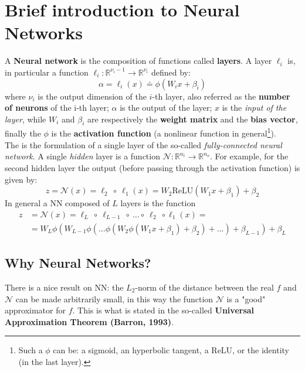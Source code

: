 \section{Brief introduction to Neural Networks}
A \textbf{Neural network} is the composition of functions called \textbf{layers}. A layer $\ell_i$ is, in particular a function $\ell_i: \mathbb{R}^{\nu_i-1}\to\mathbb{R}^{\nu_i}$ defined by:
\begin{equation}\label{eq:FCNN}
    \alpha=\ell_i(x)\doteq\phi(W_i{x}+\beta_i)
\end{equation}
where $\nu_i$ is the output dimension of the $i$-th layer, also referred as the \textbf{number of neurons} of the i-th layer; $\alpha$ is the output of the layer; $x$ is the \textit{input of the layer}, while $W_i$ and $\beta_i$ are respectively the \textbf{weight matrix} and the \textbf{bias vector}, finally the $\phi$ is the \textbf{activation function} (a nonlinear function in general\footnote{
    Such a $\phi$ can be: a sigmoid, an hyperbolic tangent, a ReLU, or the identity (in the last layer).
}).\\
The  is the formulation of a single layer of the so-called \textit{fully-connected neural network}. A single \textit{hidden} layer is a function $\mathcal{N}:\mathbb{R}^{n_i}\to\mathbb{R}^{n_o}$. For example, for the second hidden layer the output (before passing through the activation function) is given by: 
\begin{equation}
    z=\mathcal{N}(x)=\ell_2 \ \circ \ \ell_1(x)=W_2 \text{ReLU}(W_1x+\beta_1)+\beta_2
\end{equation}
In general a NN composed of $L$ layers is the function
\begin{equation*}
    \begin{aligned}
        z&=\mathcal{N}(x)=\ell_L \ \circ \ \ell_{L-1} \ \circ \ \dots \circ \ \ell_2 \ \circ \ell_1(x)=\\
        &=W_L \phi (W_{L-1}\phi(...\phi(W_2\phi(W_1x+\beta_1)+\beta_2)+...)+ \beta_{L-1})+\beta_{L}
    \end{aligned}
\end{equation*}

\subsection{Why Neural Networks?}
There is a nice result on NN: the $L_2$-norm of the distance between the real $f$ and $\mathcal{N}$ can be made arbitrarily small, in this way the function $\mathcal{N}$ is a "good" approximator for $f$. This is what is stated in the so-called \textbf{Universal Approximation Theorem (Barron, 1993)}.

